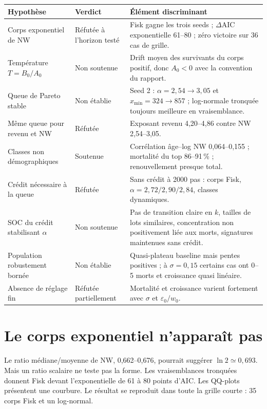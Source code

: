\documentclass[11pt,a4paper]{article}
\begin{document}
\begin{longtable}{p{}p{}p{}}
\toprule
Hypothèse & Verdict & Élément discriminant \\
\midrule
\endhead
Corps exponentiel de NW & Réfutée à l'horizon testé & Fisk gagne les trois seeds ;
$\Delta$AIC exponentielle 61--80 ; zéro victoire sur 36 cas de grille. \\
Température $T=B_0/A_0$ & Non soutenue & Drift moyen des survivants du corps
positif, donc $A_0<0$ avec la convention du rapport. \\
Queue de Pareto stable & Non établie & Seed 2 : $\alpha=2{,}54\to3{,}05$ et
$x_{\min}=324\to857$ ; log-normale tronquée toujours meilleure en vraisemblance. \\
Même queue pour revenu et NW & Réfutée & Exposant revenu 4,20--4,86 contre NW
2,54--3,05. \\
Classes non démographiques & Soutenue & Corrélation âge--log NW 0,064--0,155 ;
mortalité du top 86--91\,\% ; renouvellement presque total. \\
Crédit nécessaire à la queue & Réfutée & Sans crédit à 2000 pas : corps Fisk,
$\alpha=2{,}72/2{,}90/2{,}84$, classes dynamiques. \\
SOC du crédit stabilisant $\alpha$ & Non soutenue & Pas de transition claire en
$k$, tailles de lots similaires, concentration non positivement liée aux morts,
signatures maintenues sans crédit. \\
Population robustement bornée & Non établie & Quasi-plateau baseline mais pentes
positives ; à $\sigma=0{,}15$ certains cas ont 0--5 morts et croissance quasi
linéaire. \\
Absence de réglage fin & Réfutée partiellement & Mortalité et croissance varient
fortement avec $\sigma$ et $\varepsilon_0/w_0$. \\
\bottomrule
\end{longtable}

\section{Le corps exponentiel n'apparaît pas}

Le ratio médiane/moyenne de NW, 0,662--0,676, pourrait suggérer
$\ln2\simeq0{,}693$. Mais un ratio scalaire ne teste pas la forme. Les
vraisemblances tronquées donnent Fisk devant l'exponentielle de 61 à 80 points
d'AIC. Les QQ-plots présentent une courbure. Le résultat se reproduit dans toute
la grille courte : 35 corps Fisk et un log-normal.
\end{document}
